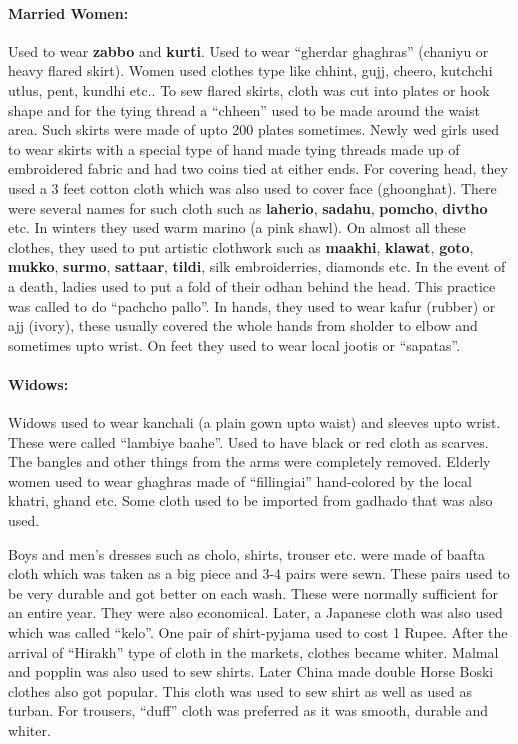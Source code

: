\paragraph{Married Women:} Used to wear \textbf{zabbo} and \textbf{kurti}. Used to wear ``gherdar ghaghras'' (chaniyu or heavy flared skirt). Women used clothes type like chhint, gujj, cheero, kutchchi utlus, pent, kundhi etc.. To sew flared skirts, cloth was cut into plates or hook shape and for the tying thread a ``chheen'' used to be made around the waist area. Such skirts were made of upto 200 plates sometimes. Newly wed girls used to wear skirts with a special type of hand made tying threads made up of embroidered fabric and had two coins tied at either ends. For covering head, they used a 3 feet cotton cloth which was also used to cover face (ghoonghat). There were several names for such cloth such as \textbf{laherio}, \textbf{sadahu}, \textbf{pomcho}, \textbf{divtho} etc. In winters they used warm marino (a pink shawl). On almost all these clothes, they used to put artistic clothwork such as \textbf{maakhi}, \textbf{klawat}, \textbf{goto}, \textbf{mukko}, \textbf{surmo}, \textbf{sattaar}, \textbf{tildi}, silk embroiderries, diamonds etc. In the event of a death, ladies used to put a fold of their odhan behind the head. This practice was called to do ``pachcho pallo''. In hands, they used to wear kafur (rubber) or ajj (ivory), these usually covered the whole hands from sholder to elbow and sometimes upto wrist. On feet they used to wear local jootis or ``sapatas''.
\paragraph{Widows:} Widows used to wear kanchali (a plain gown upto waist) and sleeves upto wrist. These were called ``lambiye baahe''. Used to have black or red cloth as scarves. The bangles and other things from the arms were completely removed. Elderly women used to wear ghaghras made of ``fillingiai'' hand-colored by the local khatri, ghand etc. Some cloth used to be imported from gadhado that was also used.

Boys and men's dresses such as cholo, shirts, trouser etc. were made of baafta cloth which was taken as a big piece and 3-4 pairs were sewn. These pairs used to be very durable and got better on each wash. These were normally sufficient for an entire year. They were also economical. Later, a Japanese cloth was also used which was called ``kelo''. One pair of shirt-pyjama used to cost 1 Rupee. After the arrival of ``Hirakh'' type of cloth in the markets, clothes became whiter. Malmal and popplin was also used to sew shirts. Later China made double Horse Boski clothes also got popular. This cloth was used to sew shirt as well as used as turban. For trousers, ``duff'' cloth was preferred as it was smooth, durable and whiter.

